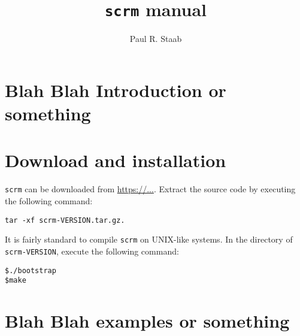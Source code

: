 \documentclass{article}
\title{{\tt scrm} manual}
\author{Paul R. Staab}
\newcommand{\cm}[1]{\begin{center}{\tt #1}\end{center}}
\begin{document}
\maketitle

\section{Blah Blah Introduction or something}

\section{Download and installation}
{\tt scrm} can be downloaded from \url{https://...}. Extract the source code by executing the following command:
\cm{tar -xf scrm-VERSION.tar.gz.}

It is fairly standard to compile {\tt scrm} on UNIX-like systems. In the directory of {\tt scrm-VERSION}, execute the following command:
\begin{verbatim}
$./bootstrap
$make
\end{verbatim}

\section{Blah Blah examples or something}

\nocite{McVean2005}
\nocite{Wiuf1999}


\end{document}
